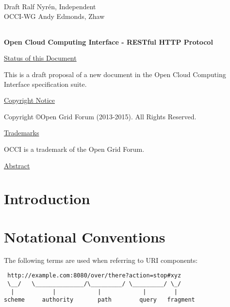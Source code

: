 \documentclass[10pt,a4paper]{article}
\begin{document}
\thispagestyle{empty}

Draft \hfill Ralf Nyrén, Independent \\
OCCI-WG \hfill Andy Edmonds, Zhaw \\
\\

\vspace*{0.5in}

\begin{Large}
\textbf{Open Cloud Computing Interface - RESTful HTTP Protocol}
\end{Large}

\vspace*{0.5in}

\underline{Status of this Document}

%
This is a draft proposal of a new document in the Open Cloud Computing
Interface specification suite.

\underline{Copyright Notice}

Copyright \copyright Open Grid Forum (2013-2015). All Rights Reserved.

\underline{Trademarks}

OCCI is a trademark of the Open Grid Forum.

\underline{Abstract}




\newpage
\tableofcontents
\newpage

\section{Introduction}
%

\section{Notational Conventions}


The following terms \cite{rfc3986} are used when referring to URI
components:

\begin{verbatim}
 http://example.com:8080/over/there?action=stop#xyz
 \__/   \______________/\_________/ \_________/ \_/
  |           |            |            |        |
scheme     authority       path        query   fragment
\end{verbatim}
\end{document}
